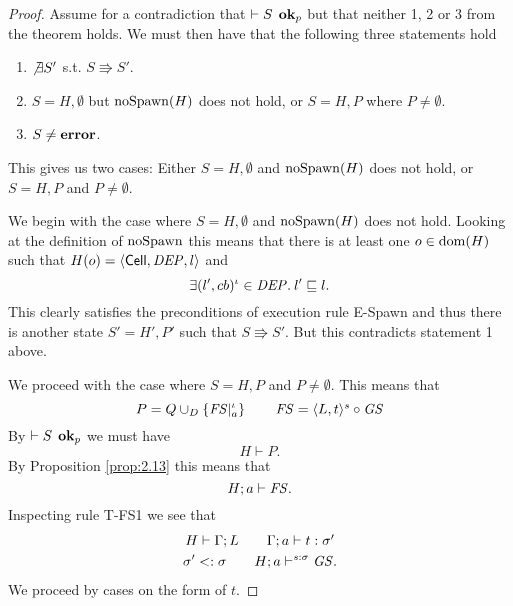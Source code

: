 \begin{proof}
  Assume for a contradiction that $\vdash S \:\: \mbox{{\bf ok}$_p$}$ but that neither 1,
  2 or 3 from the theorem holds. We must then have that the following three
  statements hold
  \begin{enumerate}
    \item $\not\exists S'$ s.t. $S \Rrightarrow S'$.
    \item $S = H, \emptyset$ but $\mbox{$\mathrm{noSpawn}$}(H)$ does not hold, or $S = H, P$
      where $P \neq \emptyset$.
    \item $S \neq \mbox{{\bf error}}$.
  \end{enumerate}
  This gives us two cases: Either $S = H, \emptyset$ and $\mbox{$\mathrm{noSpawn}$}(H)$ does not hold,
  or $S = H, P$ and $P \neq \emptyset$.

  We begin with the case where $S = H, \emptyset$ and $\mbox{$\mathrm{noSpawn}$}(H)$ does not
  hold. Looking at the definition of $\mbox{$\mathrm{noSpawn}$}$ this means that there is at
  least one $o \in \mbox{$\mathrm{dom}$}(H)$ such that $H(o) = \mbox{$\langle \mbox{$\mathsf{Cell}$}{}, \mathit{DEP}, l \rangle$}$ and
  \begin{equation*}
    \exists (l', cb)^\iota \in \mathit{DEP}. \: l' \sqsubseteq l.
  \end{equation*}
  This clearly satisfies the preconditions of execution rule {\sc E-Spawn} and
  thus there is another state $S' = H', P'$ such that $S \Rrightarrow S'$. But
  this contradicts statement 1 above.

  We proceed with the case where $S = H, P$ and $P \neq \emptyset$. This means
  that
  \begin{equation*}
    P = Q \cup_D \left\{ \mathit{FS}|_a^\iota \right\} \quad\quad \mathit{FS} = \mbox{$\langle L, t \rangle^s$} \circ \mathit{GS}
  \end{equation*}
  By $\vdash S \:\: \mbox{{\bf ok}$_p$}$ we must have
  \begin{equation*}
    H \vdash P.
  \end{equation*}
  By Proposition \ref{prop:2.13} this means that 
  \begin{equation*}
    H;a \vdash \mathit{FS}.
  \end{equation*}
  Inspecting rule {\sc T-FS1} we see that
  \begin{equation} \label{eq:prog_tbase}
    \begin{gathered}
      H \vdash \Gamma;L \quad\quad \mbox{$\Gamma;a\vdash t:\sigma'$} \\
      \sigma' <: \sigma \quad\quad H;a \vdash^{s: \sigma} \mathit{GS}.
    \end{gathered}
  \end{equation}
  We proceed by cases on the form of $t$. 
  

\end{proof}
